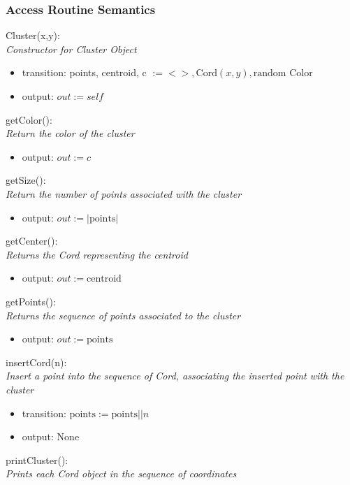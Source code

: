 \documentclass[12pt]{article}
\begin{document}
\subsubsection* {Access Routine Semantics}

Cluster(x,y):\\
\textit{Constructor for Cluster Object}
\begin{itemize}
\item transition: points, centroid, c $:=  <>, \mbox{Cord}(x,y), \mbox{random Color}$
\item output: $out := \mathit{self}$
\end{itemize}

\noindent
getColor():\\
\textit{Return the color of the cluster}
\begin{itemize}
\item output: $out := c$
\end{itemize}

\noindent
getSize():\\
\textit{Return the number of points associated with the cluster}
\begin{itemize}
\item output: $out := |\mbox{points}|$
\end{itemize}

\noindent
getCenter():\\
\textit{Returns the Cord representing the centroid}
\begin{itemize}
\item output: $out := \mbox{centroid}$
\end{itemize}

\noindent
getPoints():\\
\textit{Returns the sequence of points associated to the cluster}
\begin{itemize}
\item output: $out := \mbox{points}$
\end{itemize}

\noindent
insertCord(n):\\
\textit{Insert a point into the sequence of Cord, associating the inserted
point with the cluster}
\begin{itemize}
\item transition: $\mbox{points} := \mbox{points} || n$
\item output: None
\end{itemize}

\noindent
printCluster():\\
\textit{Prints each Cord object in the sequence of coordinates}
\end{document}
